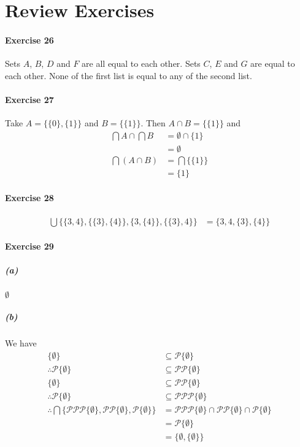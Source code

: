 \documentclass{report}
\begin{document}
    \section{Review Exercises}

    \paragraph{Exercise 26}
    Sets $A$, $B$, $D$ and $F$ are all equal to each other. Sets $C$, $E$ and $G$ are equal to each other.
    None of the first list is equal to any of the second list.

    \paragraph{Exercise 27}
    Take $A = \{ \{ 0 \}, \{ 1 \} \}$ and $B = \{ \{ 1 \} \}$.
    Then $A \cap B = \{ \{ 1 \} \}$
    and
    \begin{align*}
        \bigcap A \cap \bigcap B & = \emptyset \cap \{1\} \\
        & = \emptyset \\
        \bigcap (A \cap B) & = \bigcap \{ \{ 1 \} \} \\
        & = \{ 1 \}
    \end{align*}

    \paragraph{Exercise 28}
    \begin{align*}
        \bigcup \{ \{ 3,4 \}, \{ \{3\}, \{4\} \}, \{3, \{4\} \}, \{ \{3\}, 4\} \}
        & = \{ 3, 4, \{3\}, \{4\} \}
    \end{align*}

    \paragraph{Exercise 29}
    \subparagraph{(a)}
    $\emptyset$
    \subparagraph{(b)}
    We have 
    \begin{align*}
        \{ \emptyset \} & \subseteq \mathcal{P} \{ \emptyset \} \\
        \therefore \mathcal{P} \{\emptyset\} & \subseteq \mathcal{PP} \{ \emptyset \} \\
        \{ \emptyset \} & \subseteq \mathcal{PP} \{ \emptyset \} \\
        \therefore \mathcal{P} \{\emptyset\} & \subseteq \mathcal{PPP} \{ \emptyset \} \\
        \therefore \bigcap \{ \mathcal{PPP} \{ \emptyset \}, \mathcal{PP} \{ \emptyset \}, \mathcal{P} \{ \emptyset \} \}
        & = \mathcal{PPP} \{ \emptyset \} \cap \mathcal{PP} \{ \emptyset \} \cap \mathcal{P} \{ \emptyset \} \\
        & = \mathcal{P} \{ \emptyset \} \\
        & = \{ \emptyset, \{ \emptyset \} \}
    \end{align*}
\end{document}
